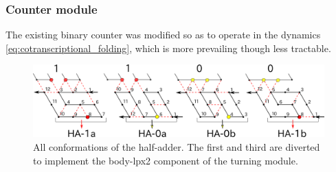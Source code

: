 			\subsubsection{Counter module}

The existing binary counter \cite{GeMeScSe2016} was modified so as to operate in the dynamics \eqref{eq:cotranscriptional_folding}, which is more prevailing \cite{HanKim2017,HaKiOtSe2016,OtaSeki2017} though less tractable. 

\begin{figure}
\vspace*{-5mm}
\centering
\includegraphics[width=\linewidth]{pic/counter_zig.png}
\caption{All conformations of the half-adder.
The first and third are diverted to implement the body-lpx2 component of the turning module. 
}
\label{fig:half-adder}
\vspace*{-3mm}
\end{figure}

